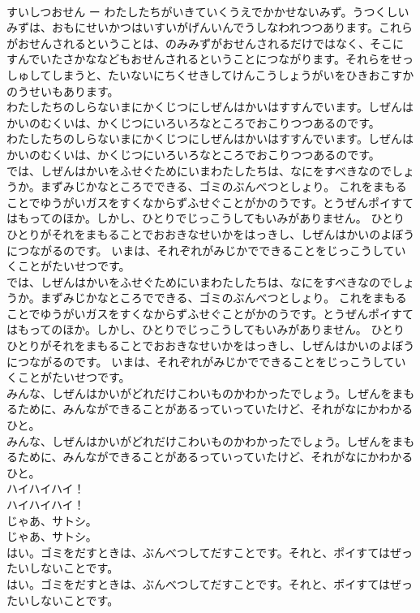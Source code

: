 \documentclass[8pt]{extreport}
\begin{document}
\begin{CJK}{UTF8}{min}
\\	すいしつおせん ー わたしたちがいきていくうえでかかせないみず。うつくしいみずは、おもにせいかつはいすいがげんいんでうしなわれつつあります。これらがおせんされるということは、のみみずがおせんされるだけではなく、そこにすんでいたさかななどもおせんされるということにつながります。それらをせっしゅしてしまうと、たいないにちくせきしてけんこうしょうがいをひきおこすかのうせいもあります。
\\	わたしたちのしらないまにかくじつにしぜんはかいはすすんでいます。しぜんはかいのむくいは、かくじつにいろいろなところでおこりつつあるのです。
\\	わたしたちのしらないまにかくじつにしぜんはかいはすすんでいます。しぜんはかいのむくいは、かくじつにいろいろなところでおこりつつあるのです。
\\	では、しぜんはかいをふせぐためにいまわたしたちは、なにをすべきなのでしょうか。まずみじかなところでできる、ゴミのぶんべつとしょり。 これをまもることでゆうがいガスをすくなからずふせぐことがかのうです。とうぜんポイすてはもってのほか。しかし、ひとりでじっこうしてもいみがありません。 ひとりひとりがそれをまもることでおおきなせいかをはっきし、しぜんはかいのよぼうにつながるのです。 いまは、それぞれがみじかでできることをじっこうしていくことがたいせつです。
\\	では、しぜんはかいをふせぐためにいまわたしたちは、なにをすべきなのでしょうか。まずみじかなところでできる、ゴミのぶんべつとしょり。 これをまもることでゆうがいガスをすくなからずふせぐことがかのうです。とうぜんポイすてはもってのほか。しかし、ひとりでじっこうしてもいみがありません。 ひとりひとりがそれをまもることでおおきなせいかをはっきし、しぜんはかいのよぼうにつながるのです。 いまは、それぞれがみじかでできることをじっこうしていくことがたいせつです。
\\	みんな、しぜんはかいがどれだけこわいものかわかったでしょう。しぜんをまもるために、みんなができることがあるっていっていたけど、それがなにかわかるひと。
\\	みんな、しぜんはかいがどれだけこわいものかわかったでしょう。しぜんをまもるために、みんなができることがあるっていっていたけど、それがなにかわかるひと。
\\	ハイハイハイ！
\\	ハイハイハイ！
\\	じゃあ、サトシ。
\\	じゃあ、サトシ。
\\	はい。ゴミをだすときは、ぶんべつしてだすことです。それと、ポイすてはぜったいしないことです。
\\	はい。ゴミをだすときは、ぶんべつしてだすことです。それと、ポイすてはぜったいしないことです。

\end{CJK}
\end{document}
